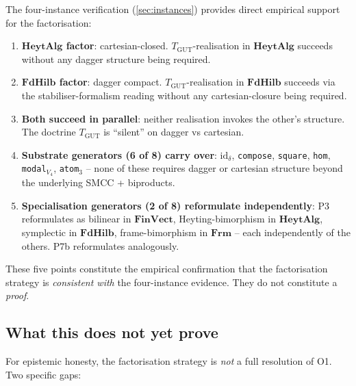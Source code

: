 \documentclass[11pt,a4paper]{article}
\theoremstyle{plain}
\theoremstyle{definition}
\theoremstyle{remark}
\newcommand{\cat}[1]{\mathbf{#1}}
\newcommand{\HeytAlg}{\cat{HeytAlg}}
\newcommand{\FdHilb}{\cat{FdHilb}}
\newcommand{\Frm}{\cat{Frm}}
\newcommand{\FinVect}{\cat{FinVect}}
\newcommand{\id}{\mathrm{id}}
\newcommand{\TGUT}{T_{\mathrm{GUT}}}
\newcommand{\smcc}{SMCC}
\begin{document}
The four-instance verification (\cref{sec:instances}) provides direct empirical support for the factorisation:

\begin{enumerate}[leftmargin=*]
\item \textbf{$\HeytAlg$ factor}: cartesian-closed. $\TGUT$-realisation in $\HeytAlg$ succeeds without any dagger structure being required.

\item \textbf{$\FdHilb$ factor}: dagger compact. $\TGUT$-realisation in $\FdHilb$ succeeds via the stabiliser-formalism reading without any cartesian-closure being required.

\item \textbf{Both succeed in parallel}: neither realisation invokes the other's structure. The doctrine $\TGUT$ is ``silent'' on dagger vs cartesian.

\item \textbf{Substrate generators (6 of 8) carry over}: $\id_\delta$, \texttt{compose}, \texttt{square}, \texttt{hom}, \texttt{modal}$_{V_4}$, \texttt{atom}$_3$ -- none of these requires dagger or cartesian structure beyond the underlying \smcc{} + biproducts.

\item \textbf{Specialisation generators (2 of 8) reformulate independently}: P3 reformulates as bilinear in $\FinVect$, Heyting-bimorphism in $\HeytAlg$, symplectic in $\FdHilb$, frame-bimorphism in $\Frm$ -- each independently of the others. P7b reformulates analogously.
\end{enumerate}

These five points constitute the empirical confirmation that the factorisation strategy is \emph{consistent with} the four-instance evidence. They do not constitute a \emph{proof}.

\subsection{What this does not yet prove}\label{sec:o1:gaps}

For epistemic honesty, the factorisation strategy is \emph{not} a full resolution of O1. Two specific gaps:
\end{document}
